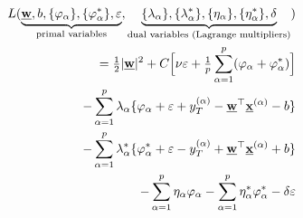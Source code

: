 \begin{frame}\frametitle{\subsecname}

		\begin{equation*}
\left.\begin{aligned}
				L(\underbrace{\underline{\mathbf{w}},b,\{\varphi_{\alpha}\},\{\varphi_{\alpha}^*\},\varepsilon}_{\text{primal variables}},
				\underbrace{\{\lambda_{\alpha}\}, \{\lambda_{\alpha}^*\},\{\eta_{\alpha}\},\{\eta_{\alpha}^*\},\delta}_{\text{dual variables (Lagrange multipliers)}})\\
				= {\textstyle \frac{1}{2}} |\underline{\mathbf{w}}|^2+C \Big\lbrack \nu \varepsilon 
					+ {\textstyle \frac{1}{p}} \sum_{\alpha=1}^p(\varphi_{\alpha}
					+\varphi_{\alpha}^*) \Big\rbrack \\
				-\sum_{\alpha=1}^p \lambda_{\alpha} \{\varphi_{\alpha}
				+\varepsilon+y_T^{(\alpha)}
				-\underline{\mathbf{w}}^\top\underline{\mathbf{x}}^{(\alpha)}-b \}  \\
				-\sum_{\alpha=1}^p \lambda_{\alpha}^* \{\varphi_{\alpha}^* 
				+\varepsilon-y_T^{(\alpha)}+\underline{\mathbf{w}}^\top\underline{\mathbf{x}}^{(\alpha)}+b \} \\ 
				-\sum_{\alpha=1}^p \eta_{\alpha} \varphi_{\alpha} 
				- \sum_{\alpha=1}^p \eta_{\alpha}^* \varphi_{\alpha}^* 
				- \delta \varepsilon
			\end{aligned}\right.
\end{equation*}

\end{frame}

